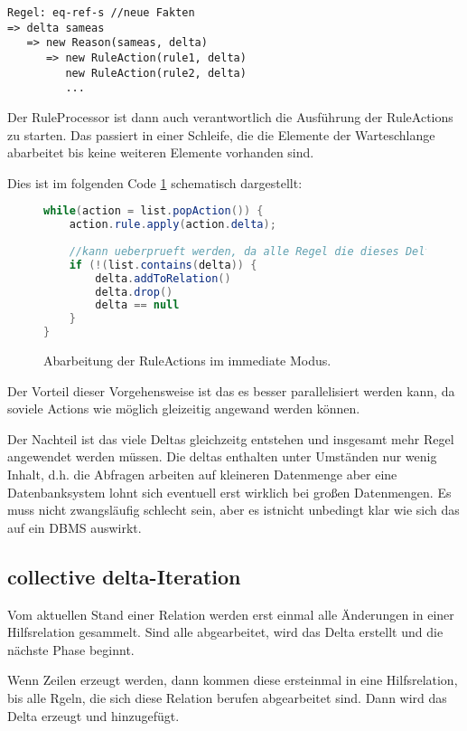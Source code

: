 \begin{verbatim}
Regel: eq-ref-s //neue Fakten
=> delta sameas
   => new Reason(sameas, delta)
      => new RuleAction(rule1, delta)
         new RuleAction(rule2, delta)
         ...
\end{verbatim}

Der RuleProcessor ist dann auch verantwortlich die Ausführung der RuleActions zu starten. Das passiert in einer Schleife, die die Elemente der Warteschlange abarbeitet bis keine weiteren Elemente vorhanden sind.

Dies ist im folgenden Code \ref{code-immediate-delta-iteration} schematisch dargestellt:

\begin{figure}[htp]
	\caption{Abarbeitung der RuleActions im immediate Modus.}
	\label{code-immediate-delta-iteration}
	\begin{lstlisting}[language=Java]
while(action = list.popAction()) {
	action.rule.apply(action.delta);
	
	//kann ueberprueft werden, da alle Regel die dieses Delta benoetigen koennten sofort erzeugt werden
	if (!(list.contains(delta)) {
		delta.addToRelation()
		delta.drop()
		delta == null
	}
}
	\end{lstlisting}
\end{figure}


Der Vorteil dieser Vorgehensweise ist das es besser parallelisiert werden kann, da soviele Actions wie möglich gleizeitig angewand werden können.

Der Nachteil ist das viele Deltas gleichzeitg entstehen und insgesamt mehr Regel angewendet werden müssen. Die deltas enthalten unter Umständen nur wenig Inhalt, d.h. die Abfragen arbeiten auf kleineren Datenmenge aber eine Datenbanksystem lohnt sich eventuell erst wirklich bei großen Datenmengen. Es muss nicht zwangsläufig schlecht sein, aber es istnicht unbedingt klar wie sich das auf ein DBMS auswirkt.

\subsection{collective delta-Iteration}

Vom aktuellen Stand einer Relation werden erst einmal alle Änderungen in einer Hilfsrelation gesammelt. Sind alle abgearbeitet, wird das Delta erstellt und die nächste Phase beginnt.

Wenn Zeilen erzeugt werden, dann kommen diese ersteinmal in eine Hilfsrelation, bis alle Rgeln, die sich diese Relation berufen abgearbeitet sind. Dann wird das Delta erzeugt und hinzugefügt.

